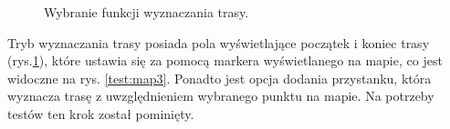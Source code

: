 \setlength{\fboxrule}{0.5pt}
\begin{figure}[H]
    \centering
    \caption{Wybranie funkcji wyznaczania trasy.}
    \label{test:map2}
\end{figure}

Tryb wyznaczania trasy posiada pola wyświetlające początek i koniec trasy (rys.\ref{test:map2}), które ustawia się za pomocą markera wyświetlanego na mapie, co jest widoczne na rys. \ref{test:map3}. Ponadto jest opcja dodania przystanku, która wyznacza trasę z uwzględnieniem wybranego punktu na mapie. Na potrzeby testów ten krok został pominięty.

